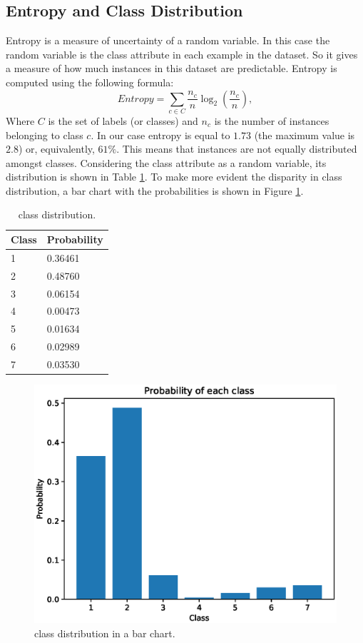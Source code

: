 \documentclass[a4paper, 10pt]{article}
\begin{document}
\subsection{Entropy and Class Distribution}
Entropy is a measure of uncertainty of a random variable. In this case the random variable is the class attribute in each example in the dataset. So it gives a measure of how much instances in this dataset are predictable. Entropy is computed using the following formula:
\begin{equation}
	\textit{Entropy} = \sum_{c \in C}\dfrac{n_c}{n}\log_2\left(\dfrac{n_c}{n}\right),
\end{equation}
Where $C$ is the set of labels (or classes) and $n_c$ is the number of instances belonging to class $c$. In our case entropy is equal to $1.73$ (the maximum value is $2.8$) or, equivalently, $61\%$. This means that instances are not equally distributed amongst classes. Considering the class attribute as a random variable, its distribution is shown in Table \ref{tab:class_dist}. To make more evident the disparity in class distribution, a bar chart with the probabilities is shown in Figure \ref{fig:class_dist}.  

\begin{table}[H]
 \centering
 \begin{tabular}{|l|l|}
 \hline
 \textbf{Class} & \textbf{Probability} \\\hline
 1 & 0.36461\\\hline
2 & 0.48760\\\hline 
3 & 0.06154\\\hline 
4 & 0.00473\\\hline 
5 & 0.01634\\\hline 
6 & 0.02989\\\hline
7 & 0.03530\\\hline
 \end{tabular}
\caption{class distribution.}
\label{tab:class_dist}
\end{table}

\begin{figure}[H]
 \centering
 \includegraphics[width=0.8\linewidth]{pictures/class_dist.eps}
 \caption{class distribution in a bar chart.}
 \label{fig:class_dist}
\end{figure}
\end{document}
